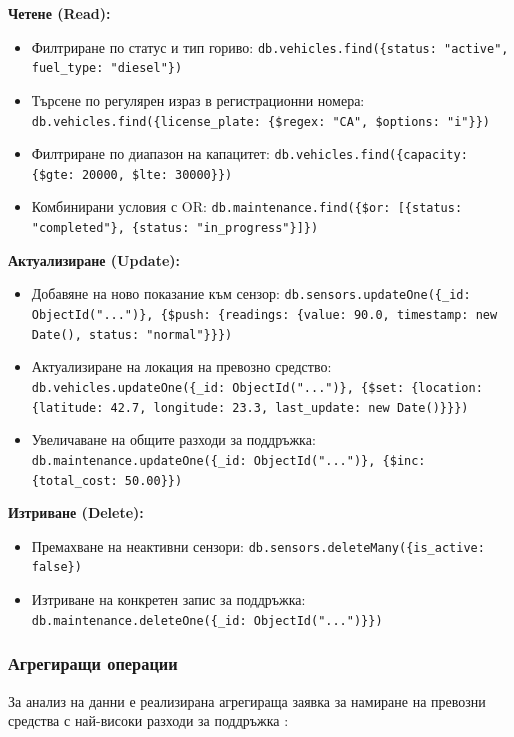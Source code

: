 \textbf{Четене (Read):}
\begin{itemize}
    \item Филтриране по статус и тип гориво: \texttt{db.vehicles.find(\{status: "active", fuel\_type: "diesel"\})}
    \item Търсене по регулярен израз в регистрационни номера: \texttt{db.vehicles.find(\{license\_plate: \{\$regex: "CA", \$options: "i"\}\})}
    \item Филтриране по диапазон на капацитет: \texttt{db.vehicles.find(\{capacity: \{\$gte: 20000, \$lte: 30000\}\})}
    \item Комбинирани условия с OR: \texttt{db.maintenance.find(\{\$or: [\{status: "completed"\}, \{status: "in\_progress"\}]\})}
\end{itemize}

\textbf{Актуализиране (Update):}
\begin{itemize}
    \item Добавяне на ново показание към сензор: \texttt{db.sensors.updateOne(\{\_id: ObjectId("...")\}, \{\$push: \{readings: \{value: 90.0, timestamp: new Date(), status: "normal"\}\}\})}
    \item Актуализиране на локация на превозно средство: \texttt{db.vehicles.updateOne(\{\_id: ObjectId("...")\}, \{\$set: \{location: \{latitude: 42.7, longitude: 23.3, last\_update: new Date()\}\}\})}
    \item Увеличаване на общите разходи за поддръжка: \texttt{db.maintenance.updateOne(\{\_id: ObjectId("...")\}, \{\$inc: \{total\_cost: 50.00\}\})}
\end{itemize}

\textbf{Изтриване (Delete):}
\begin{itemize}
    \item Премахване на неактивни сензори: \texttt{db.sensors.deleteMany(\{is\_active: false\})}
    \item Изтриване на конкретен запис за поддръжка: \texttt{db.maintenance.deleteOne(\{\_id: ObjectId("...")\}\})}
\end{itemize}

\subsubsection{Агрегиращи операции}

За анализ на данни е реализирана агрегираща заявка за намиране на превозни средства с най-високи разходи за поддръжка \cite{mongodb_definitive}:

